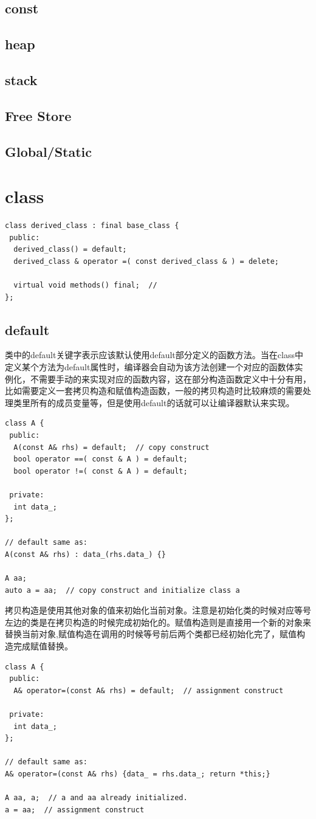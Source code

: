 \documentclass[12pt]{book}
\begin{document}
\subsection{const}
\subsection{heap}
\subsection{stack}
\subsection{Free Store}
\subsection{Global/Static}

\section{class}
\begin{lstlisting}
class derived_class : final base_class {
 public:
  derived_class() = default;
  derived_class & operator =( const derived_class & ) = delete;
  
  virtual void methods() final;	 //
};
\end{lstlisting}

\subsection{default}
类中的default关键字表示应该默认使用default部分定义的函数方法。当在class中定义某个方法为default属性时，编译器会自动为该方法创建一个对应的函数体实例化，不需要手动的来实现对应的函数内容，这在部分构造函数定义中十分有用，比如需要定义一套拷贝构造和赋值构造函数，一般的拷贝构造时比较麻烦的需要处理类里所有的成员变量等，但是使用default的话就可以让编译器默认来实现。
\begin{lstlisting}
class A {
 public:
  A(const A& rhs) = default;  // copy construct
  bool operator ==( const & A ) = default;
  bool operator !=( const & A ) = default;
  
 private:
  int data_;
};

// default same as:
A(const A& rhs) : data_(rhs.data_) {}

A aa;
auto a = aa;  // copy construct and initialize class a
\end{lstlisting}
拷贝构造是使用其他对象的值来初始化当前对象。注意是初始化类的时候对应等号左边的类是在拷贝构造的时候完成初始化的。赋值构造则是直接用一个新的对象来替换当前对象,赋值构造在调用的时候等号前后两个类都已经初始化完了，赋值构造完成赋值替换。
\begin{lstlisting}
class A {
 public:
  A& operator=(const A& rhs) = default;  // assignment construct

 private:
  int data_;
};
	
// default same as:
A& operator=(const A& rhs) {data_ = rhs.data_; return *this;}
	
A aa, a;  // a and aa already initialized.
a = aa;  // assignment construct
\end{lstlisting}
\end{document}
